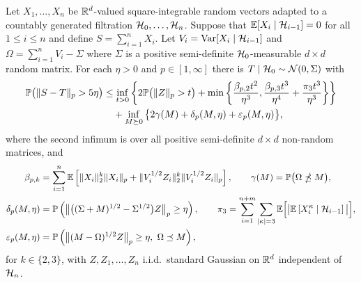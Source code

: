 \begin{lemma}%
  \label{lem:yurinskii_app_sa_martingale}

  Let $X_1, \ldots, X_n$ be $\R^d$-valued
  square-integrable random vectors
  adapted to a countably generated
  filtration $\cH_0, \ldots, \cH_n$.
  Suppose that
  $\E[X_i \mid \cH_{i-1}] = 0$ for all $1 \leq i \leq n$
  and define $S = \sum_{i=1}^n X_i$.
  Let $V_i = \Var[X_i \mid \cH_{i-1}]$ and
  $\Omega = \sum_{i=1}^n V_i - \Sigma$
  where $\Sigma$ is a positive semi-definite
  $\cH_0$-measurable $d \times d$ random matrix.
  For each $\eta > 0$ and $p \in [1,\infty]$
  there is $T \mid \cH_0 \sim \cN(0, \Sigma)$ with
  \begin{align*}
    \P\big(\|S-T\|_p > 5\eta\big)
    &\leq
    \inf_{t>0}
    \left\{
      2 \P\big( \|Z\|_p > t \big)
      + \min\left\{
        \frac{\beta_{p,2} t^2}{\eta^3},
        \frac{\beta_{p,3} t^3}{\eta^4}
        + \frac{\pi_3 t^3}{\eta^3}
      \right\}
    \right\} \\
    \nonumber
    &\quad+
    \inf_{M \succeq 0}
    \big\{ 2\gamma(M) + \delta_p(M,\eta)
    + \varepsilon_p(M, \eta)\big\},
  \end{align*}
  where the second infimum is over all positive semi-definite
  $d \times d$ non-random matrices, and
  \begin{align*}
    \beta_{p,k}
    &=
    \sum_{i=1}^n \E\left[\| X_i \|^k_2 \| X_i \|_p
    + \|V_i^{1/2} Z_i \|^k_2 \|V_i^{1/2} Z_i \|_p \right],
    \qquad\gamma(M)
    = \P\big(\Omega \npreceq M\big), \\
    \delta_p(M,\eta)
    &=
    \P\left(
      \big\|\big((\Sigma +M)^{1/2}- \Sigma^{1/2}\big) Z\big\|_p
      \geq \eta
    \right),
    \qquad\pi_3
    =
    \sum_{i=1}^{n+m}
    \sum_{|\kappa| = 3}
    \E \Big[ \big|
      \E \left[ X_i^\kappa \mid \cH_{i-1} \right]
    \big| \Big], \\
    \varepsilon_p(M, \eta)
    &=
    \P\left(\big\| (M - \Omega)^{1/2} Z \big\|_p\geq \eta, \
    \Omega \preceq M\right),
  \end{align*}
  for $k \in \{2,3\}$, with $Z, Z_1,\dots ,Z_n$ i.i.d.\ standard Gaussian
  on $\R^d$ independent of $\cH_n$.
\end{lemma}

